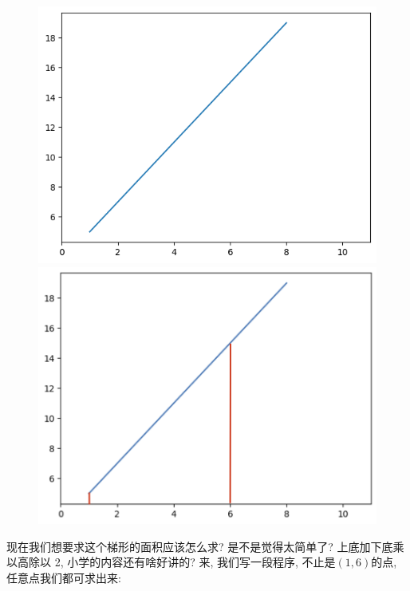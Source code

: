 \begin{figure}[ht]
  \begin{minipage}[h]{0.49\textwidth}
    \centering
    \includegraphics[width=\textwidth]{asset/20230902194132.png}
    \caption{}
    \label{fig:img13_7}
  \end{minipage} %
  \begin{minipage}[h]{0.49\textwidth}
    \centering
    \includegraphics[width=\textwidth]{asset/20230902194557.png}
    \caption{}
    \label{fig:img13_8}
  \end{minipage}
\end{figure}

现在我们想要求这个梯形的面积应该怎么求? 是不是觉得太简单了? 上底加下底乘以高除以 2, 小学的内容还有啥好讲的? 来, 我们写一段程序, 不止是$(1, 6)$的点, 任意点我们都可求出来:

